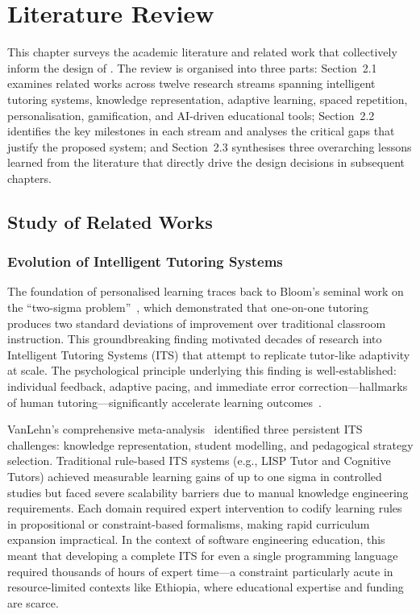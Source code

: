 \chapter{Literature Review}

This chapter surveys the academic literature and related work that collectively inform the design of \projectname. The review is organised into three parts: Section~2.1 examines related works across twelve research streams spanning intelligent tutoring systems, knowledge representation, adaptive learning, spaced repetition, personalisation, gamification, and AI-driven educational tools; Section~2.2 identifies the key milestones in each stream and analyses the critical gaps that justify the proposed system; and Section~2.3 synthesises three overarching lessons learned from the literature that directly drive the design decisions in subsequent chapters.

\section{Study of Related Works}
\label{sec:related-works}

\subsection{Evolution of Intelligent Tutoring Systems}
\label{sec:its-evolution}

The foundation of personalised learning traces back to Bloom's seminal work on the \enquote{two-sigma problem}~\cite{bloom1984}, which demonstrated that one-on-one tutoring produces two standard deviations of improvement over traditional classroom instruction. This groundbreaking finding motivated decades of research into Intelligent Tutoring Systems (ITS) that attempt to replicate tutor-like adaptivity at scale. The psychological principle underlying this finding is well-established: individual feedback, adaptive pacing, and immediate error correction---hallmarks of human tutoring---significantly accelerate learning outcomes~\cite{kulik1991}.

VanLehn's comprehensive meta-analysis~\cite{vanlehn2011} identified three persistent ITS challenges: knowledge representation, student modelling, and pedagogical strategy selection. Traditional rule-based ITS systems (e.g., LISP Tutor and Cognitive Tutors) achieved measurable learning gains of up to one sigma in controlled studies but faced severe scalability barriers due to manual knowledge engineering requirements. Each domain required expert intervention to codify learning rules in propositional or constraint-based formalisms, making rapid curriculum expansion impractical. In the context of software engineering education, this meant that developing a complete ITS for even a single programming language required thousands of hours of expert time---a constraint particularly acute in resource-limited contexts like Ethiopia, where educational expertise and funding are scarce.

